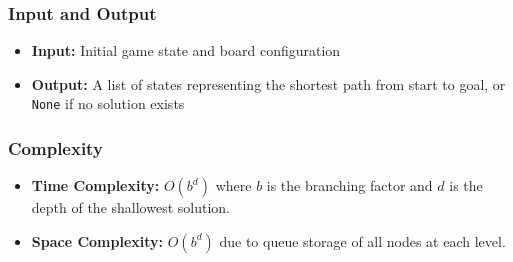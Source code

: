 \subsubsection*{Input and Output}
\begin{itemize}
    \item \textbf{Input:} Initial game state and board configuration
    \item \textbf{Output:} A list of states representing the shortest path from start to goal, or \texttt{None} if no solution exists
\end{itemize}

\subsubsection*{Complexity}
\begin{itemize}
    \item \textbf{Time Complexity:} $O(b^d)$ where $b$ is the branching factor and $d$ is the depth of the shallowest solution.
    \item \textbf{Space Complexity:} $O(b^d)$ due to queue storage of all nodes at each level.
\end{itemize}



